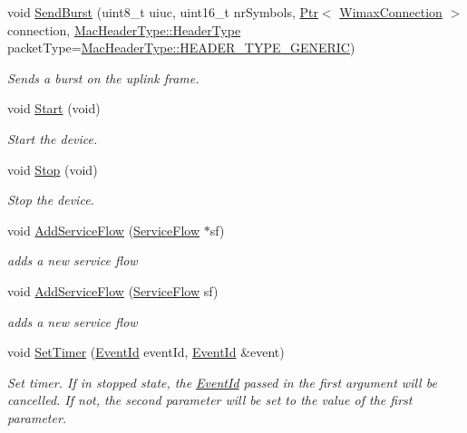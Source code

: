 \begin{DoxyCompactItemize}
void \hyperlink{classns3_1_1SubscriberStationNetDevice_af7a47a79b3eb7f1c4906381f091b08f3}{Send\+Burst} (uint8\+\_\+t uiuc, uint16\+\_\+t nr\+Symbols, \hyperlink{classns3_1_1Ptr}{Ptr}$<$ \hyperlink{classns3_1_1WimaxConnection}{Wimax\+Connection} $>$ connection, \hyperlink{classns3_1_1MacHeaderType_a54d8fc8bc93a2b7865627965cdd31c20}{Mac\+Header\+Type\+::\+Header\+Type} packet\+Type=\hyperlink{classns3_1_1MacHeaderType_a54d8fc8bc93a2b7865627965cdd31c20a48fe5b2f20cadf78008c71469b518403}{Mac\+Header\+Type\+::\+H\+E\+A\+D\+E\+R\+\_\+\+T\+Y\+P\+E\+\_\+\+G\+E\+N\+E\+R\+IC})
\begin{DoxyCompactList}\small\item\em Sends a burst on the uplink frame. \end{DoxyCompactList}\item 
void \hyperlink{classns3_1_1SubscriberStationNetDevice_a06398e06093f7d19cdd61ae1f0d5454c}{Start} (void)
\begin{DoxyCompactList}\small\item\em Start the device. \end{DoxyCompactList}\item 
void \hyperlink{classns3_1_1SubscriberStationNetDevice_a748eed840d3f7c3bb212f005206e9d8c}{Stop} (void)
\begin{DoxyCompactList}\small\item\em Stop the device. \end{DoxyCompactList}\item 
void \hyperlink{classns3_1_1SubscriberStationNetDevice_af90b31dd4b3f4a52acdc195443c7138f}{Add\+Service\+Flow} (\hyperlink{classns3_1_1ServiceFlow}{Service\+Flow} $\ast$sf)
\begin{DoxyCompactList}\small\item\em adds a new service flow \end{DoxyCompactList}\item 
void \hyperlink{classns3_1_1SubscriberStationNetDevice_a9aa47dab96ad3ef941d7c05ee34dd49d}{Add\+Service\+Flow} (\hyperlink{classns3_1_1ServiceFlow}{Service\+Flow} sf)
\begin{DoxyCompactList}\small\item\em adds a new service flow \end{DoxyCompactList}\item 
void \hyperlink{classns3_1_1SubscriberStationNetDevice_a6eecf760ab983e9d6d44c76d356fce9b}{Set\+Timer} (\hyperlink{classns3_1_1EventId}{Event\+Id} event\+Id, \hyperlink{classns3_1_1EventId}{Event\+Id} \&event)
\begin{DoxyCompactList}\small\item\em Set timer. If in stopped state, the \hyperlink{classns3_1_1EventId}{Event\+Id} passed in the first argument will be cancelled. If not, the second parameter will be set to the value of the first parameter. \end{DoxyCompactList}\item 

\end{DoxyCompactItemize}
